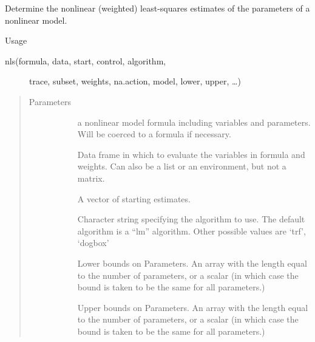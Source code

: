 \documentclass[letterpaper,10pt,english]{sphinxmanual}
\begin{document}
\begin{fulllineitems}
\label{\detokenize{_modules/nlrob:nlrob.nls}}
Determine the nonlinear (weighted) least-squares estimates of the parameters of a nonlinear model.

Usage
\begin{description}
\item[{nls(formula, data, start, control, algorithm,}] \leavevmode
trace, subset, weights, na.action, model,
lower, upper, …)

\end{description}
\begin{quote}\begin{description}
\item[{Parameters}] \leavevmode\begin{description}
\item[{}] \leavevmode
a nonlinear model formula including variables and parameters. Will be coerced to a formula if necessary.

\item[{}] \leavevmode
Data frame in which to evaluate the variables in formula and weights. Can also be a list or an environment, but not a matrix.

\item[{}] \leavevmode
A vector of starting estimates.

\item[{}] \leavevmode
Character string specifying the algorithm to use. The default algorithm is a “lm” algorithm. Other possible values are ‘trf’, ‘dogbox’

\item[{}] \leavevmode
Lower bounds on Parameters. An array with the length equal
to the number of parameters, or a scalar (in which case the bound is
taken to be the same for all parameters.)

\item[{}] \leavevmode
Upper bounds on Parameters. An array with the length equal
to the number of parameters, or a scalar (in which case the bound is
taken to be the same for all parameters.)


\end{description}
\end{description}
\end{quote}
\end{fulllineitems}
\end{document}
